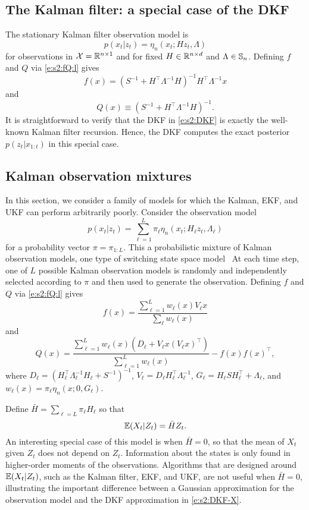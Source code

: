 \subsection{The Kalman filter: a special case of the DKF}

The stationary Kalman filter observation model is
\[ p(x_t|z_t) = \eta_n(x_t;Hz_t,\Lambda) \]
for observations in ${\mathcal{X}}=\mathbb{R}^{n\times 1}$ and for fixed $H\in\mathbb{R}^{n\times d}$ and $\Lambda\in\mathbb{S}_n$. Defining $f$ and $Q$ via \eqref{e:s2:fQ:l} gives
\[ f(x) = (S^{-1} + H^\intercal \Lambda^{-1} H)^{-1} H^\intercal \Lambda^{-1} x\]
and
\[ Q(x) \equiv  (S^{-1} + H^\intercal \Lambda^{-1} H)^{-1}. \]
It is straightforward to verify that the DKF in \eqref{e:s2:DKF} is exactly the well-known Kalman filter recursion. Hence, the DKF computes the exact posterior $p(z_t|x_{1:t})$ in this special case.

\subsection{Kalman observation mixtures} \label{s:kalman_mix}

In this section, we consider a family of models for which the Kalman, EKF, and UKF can perform arbitrarily poorly.  Consider the observation model
\[ p(x_t|z_t) = \textstyle \sum_{\ell=1}^L \pi_\ell \eta_n(x_t;H_\ell z_t,\Lambda_\ell) \]
for a probability vector $\pi=\pi_{1:L}$. This a probabilistic mixture of Kalman observation models, one type of switching state space model~\cite[see][]{Shu91,Gha00}
At each time step, one of $L$ possible Kalman observation models is randomly and independently selected according to $\pi$ and then used to generate the observation. Defining $f$ and $Q$ via \eqref{e:s2:fQ:l} gives 
\[ f(x) = \frac{\sum_{\ell=1}^L w_\ell(x) V_\ell x}{\sum_\ell w_\ell(x)}\]
and
\[ Q(x) =  \frac{\sum_{\ell=1}^L w_\ell(x)  (D_\ell + V_\ell x(V_\ell x)^\intercal)}{\sum_{\ell=1}^L w_\ell(x)} - f(x)f(x)^\intercal, \]
where $D_\ell=(H_\ell^\intercal \Lambda_\ell^{-1} H_\ell+ S^{-1})^{-1}$,  $V_\ell= D_\ell H_\ell^\intercal \Lambda_\ell^{-1}$, $G_\ell= H_\ell S H_\ell^\intercal+\Lambda_\ell$, and $w_\ell(x)= \pi_\ell \eta_n(x; 0, G_\ell )$.

Define $\bar H=\sum_{\ell=L} \pi_\ell H_\ell$ so that
\begin{equation} \operatorname{\mathbb{E}}(X_t|Z_t) = \bar H Z_t \label{e:s2:barH}  . \end{equation}
An interesting special case of this model is when $\bar H=0$, so that the mean of $X_t$ given $Z_t$ does not depend on $Z_t$. Information about the states is only found in higher-order moments of the observations. Algorithms that are designed around $\operatorname{\mathbb{E}}(X_t|Z_t)$, such as the Kalman filter, EKF, and UKF, are not useful when $\bar H=0$, illustrating the important difference between a Gaussian approximation for the observation model and the DKF approximation in \eqref{e:s2:DKF-X}.

